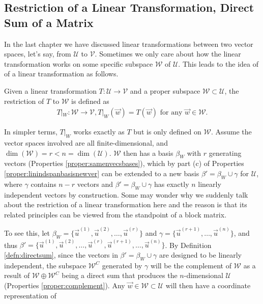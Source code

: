 \subsection{Restriction of a Linear Transformation, Direct Sum of a Matrix}
In the last chapter we have discussed linear transformations between two vector spaces, let's say, from $\mathcal{U}$ to $\mathcal{V}$. Sometimes we only care about how the linear transformation works on some specific subspace $\mathcal{W}$ of $\mathcal{U}$. This leads to the idea of  of a linear transformation as follows.
\begin{defn}
Given a linear transformation $T: \mathcal{U} \to \mathcal{V}$ and a proper subspace $\mathcal{W} \subset \mathcal{U}$, the restriction of $T$ to $\mathcal{W}$ is defined as
\begin{align*}
T|_W: \mathcal{W} \to \mathcal{V}, T|_W(\vec{w}) = T(\vec{w}) \text{ for any $\vec{w} \in \mathcal{W}$.}
\end{align*}
\end{defn}
In simpler terms, $T|_W$ works exactly as $T$ but is only defined on $\mathcal{W}$. Assume the vector spaces involved are all finite-dimensional, and $\dim(\mathcal{W}) = r < n = \dim(\mathcal{U})$. $\mathcal{W}$ then has a basis $\mathcal{\beta}_W$ with $r$ generating vectors (Properties \ref{proper:samenvecsbases}), which by part (c) of Properties \ref{proper:linindspanbasisnewver} can be extended to a new basis $\mathcal{\beta}' = \mathcal{\beta}_W \cup \mathcal{\gamma}$ for $\mathcal{U}$, where $\mathcal{\gamma}$ contains $n - r$ vectors and $\mathcal{\beta}' = \mathcal{\beta}_W \cup \mathcal{\gamma}$ has exactly $n$ linearly independent vectors by construction. Some may wonder why we suddenly talk about the restriction of a linear transformation here and the reason is that its related principles can be viewed from the standpoint of a block matrix.\par
To see this, let $\mathcal{\beta}_W = \{\vec{u}^{(1)}, \vec{u}^{(2)}, \ldots, \vec{u}^{(r)}\}$ and $\mathcal{\gamma} = \{\vec{u}^{(r+1)}, \ldots, \vec{u}^{(n)}\}$, and thus $\mathcal{\beta}' = \{\vec{u}^{(1)}, \vec{u}^{(2)}, \ldots, \vec{u}^{(r)}, \vec{u}^{(r+1)}, \ldots, \vec{u}^{(n)}\}$. By Definition \ref{defn:directsum}, since the vectors in $\mathcal{\beta}' = \mathcal{\beta}_W \cup \mathcal{\gamma}$ are designed to be linearly independent, the subspace $\mathcal{W}^C$ generated by $\mathcal{\gamma}$ will be the complement of $\mathcal{W}$ as a result of $\mathcal{W} \oplus \mathcal{W}^C$ being a direct sum that produces the $n$-dimensional $\mathcal{U}$ (Properties \ref{proper:complement}). Any $\vec{w} \in \mathcal{W} \subset \mathcal{U}$ will then have a coordinate representation of
